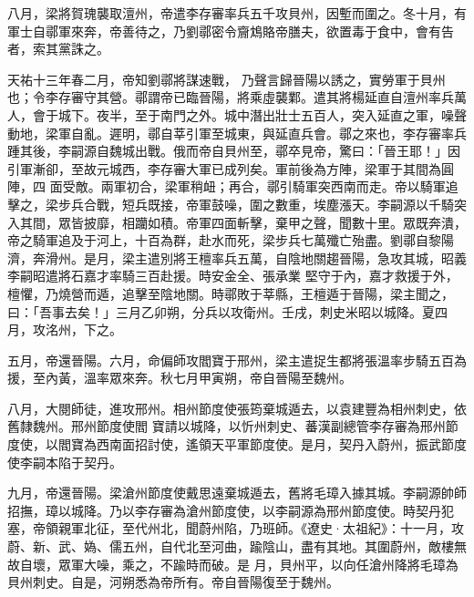 \begin{pinyinscope}
 八月，梁將賀瑰襲取澶州，帝遣李存審率兵五千攻貝州，因塹而圍之。冬十月，有軍士自鄩軍來奔，帝善待之，乃劉鄩密令齎鴆賂帝膳夫，欲置毒于食中，會有告者，索其黨誅之。



 天祐十三年春二月，帝知劉鄩將謀速戰，
 乃聲言歸晉陽以誘之，實勞軍于貝州也；令李存審守其營。鄩謂帝已臨晉陽，將乘虛襲鄴。遣其將楊延直自澶州率兵萬人，會于城下。夜半，至于南門之外。城中潛出壯士五百人，突入延直之軍，噪聲動地，梁軍自亂。遲明，鄩自莘引軍至城東，與延直兵會。鄩之來也，李存審率兵踵其後，李嗣源自魏城出戰。俄而帝自貝州至，鄩卒見帝，驚曰：「晉王耶！」因引軍漸卻，至故元城西，李存審大軍已成列矣。軍前後為方陣，梁軍于其間為圓陣，四
 面受敵。兩軍初合，梁軍稍衄；再合，鄩引騎軍突西南而走。帝以騎軍追擊之，梁步兵合戰，短兵既接，帝軍鼓噪，圍之數重，埃塵漲天。李嗣源以千騎突入其間，眾皆披靡，相躪如積。帝軍四面斬擊，棄甲之聲，聞數十里。眾既奔潰，帝之騎軍追及于河上，十百為群，赴水而死，梁步兵七萬殲亡殆盡。劉鄩自黎陽濟，奔滑州。是月，梁主遣別將王檀率兵五萬，自陰地關趨晉陽，急攻其城，昭義李嗣昭遣將石嘉才率騎三百赴援。時安金全、張承業
 堅守于內，嘉才救援于外，檀懼，乃燒營而遁，追擊至陰地關。時鄩敗于莘縣，王檀遁于晉陽，梁主聞之，曰：「吾事去矣！」三月乙卯朔，分兵以攻衛州。壬戌，刺史米昭以城降。夏四月，攻洺州，下之。



 五月，帝還晉陽。六月，命偏師攻閻寶于邢州，梁主遣捉生都將張溫率步騎五百為援，至內黃，溫率眾來奔。秋七月甲寅朔，帝自晉陽至魏州。



 八月，大閱師徒，進攻邢州。相州節度使張筠棄城遁去，以袁建豐為相州刺史，依舊隸魏州。邢州節度使閻
 寶請以城降，以忻州刺史、蕃漢副總管李存審為邢州節度使，以閻寶為西南面招討使，遙領天平軍節度使。是月，契丹入蔚州，振武節度使李嗣本陷于契丹。



 九月，帝還晉陽。梁滄州節度使戴思遠棄城遁去，舊將毛璋入據其城。李嗣源帥師招撫，璋以城降。乃以李存審為滄州節度使，以李嗣源為邢州節度使。時契丹犯塞，帝領親軍北征，至代州北，聞蔚州陷，乃班師。《遼史·太祖紀》：十一月，攻蔚、新、武、媯、儒五州，自代北至河曲，踰陰山，盡有其地。其圍蔚州，敵樓無故自壞，眾軍大噪，乘之，不踰時而破。是
 月，貝州平，以向任滄州降將毛璋為貝州刺史。自是，河朔悉為帝所有。帝自晉陽復至于魏州。




\end{pinyinscope}
